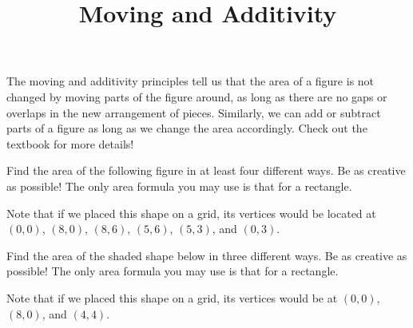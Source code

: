 \documentclass[noauthor,nooutcomes, handout]{ximera}
\begin{document}
\title{Moving and Additivity}
\begin{abstract}
\end{abstract}
\maketitle

The moving and additivity principles tell us that the area of a figure is not changed by moving parts of the figure around, as long as there are no gaps or overlaps in the new arrangement of pieces.  Similarly, we can add or subtract parts of a figure as long as we change the area accordingly.  Check out the textbook for more details!

\begin{problem}
Find the area of the following figure in at least four different ways.  Be as creative as possible!  The only area formula you may use is that for a rectangle.

Note that if we placed this shape on a grid, its vertices would be located at $(0,0)$, $(8,0)$, $(8,6)$, $(5,6)$, $(5,3)$, and $(0,3)$.
\begin{center}
\end{center}
\end{problem}



\pagebreak

\begin{problem}
Find the area of the shaded shape below in three different ways.  Be as creative as possible!  The only area formula you may use is that for a rectangle.

Note that if we placed this shape on a grid, its vertices would be at $(0,0)$, $(8,0)$, and $(4,4)$.

\begin{center}
\end{center}
\end{problem} \vfill
\end{document}
